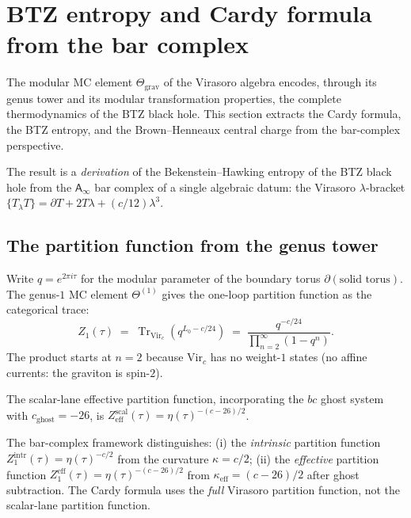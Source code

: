 \documentclass[11pt]{article}
\newcommand{\Ainf}{\mathsf{A}_{\infty}}
\newcommand{\Tr}{\operatorname{Tr}}
\begin{document}
\section{BTZ entropy and Cardy formula from the bar complex}
\label{sec:btz-entropy-cardy}

The modular MC element $\Theta_{\mathrm{grav}}$ of the Virasoro
algebra encodes, through its genus tower and its modular
transformation properties, the complete thermodynamics of the
BTZ black hole.  This section extracts the Cardy formula, the
BTZ entropy, and the Brown--Henneaux central charge from the
bar-complex perspective.

The result is a \emph{derivation} of the Bekenstein--Hawking
entropy of the BTZ black hole from the $\Ainf$ bar complex of
a single algebraic datum: the Virasoro $\lambda$-bracket
$\{T_\lambda T\} = \partial T + 2T\lambda + (c/12)\lambda^3$.

\subsection{The partition function from the genus tower}
\label{subsec:btz-partition}

Write $q = e^{2\pi i\tau}$ for the modular parameter of the
boundary torus $\partial(\text{solid torus})$.  The genus-$1$
MC element $\Theta^{(1)}$ gives the one-loop partition function
as the categorical trace:
\begin{equation}\label{eq:btz-Z1}
Z_1(\tau)
\;=\;
\Tr_{\mathrm{Vir}_c}\!\left(q^{L_0 - c/24}\right)
\;=\;
\frac{q^{-c/24}}{\prod_{n=2}^{\infty}(1-q^n)}.
\end{equation}
The product starts at $n=2$ because $\mathrm{Vir}_c$ has no
weight-$1$ states (no affine currents: the graviton is spin-$2$).

The scalar-lane effective partition function, incorporating the
$bc$ ghost system with $c_{\mathrm{ghost}} = -26$, is
$Z_{\mathrm{eff}}^{\mathrm{scal}}(\tau) = \eta(\tau)^{-(c-26)/2}$.

\begin{observation}
\label{obs:two-partition-functions-wn}
The bar-complex framework distinguishes:
(i) the \emph{intrinsic} partition function
$Z_1^{\mathrm{intr}}(\tau) = \eta(\tau)^{-c/2}$ from the
curvature $\kappa = c/2$;
(ii) the \emph{effective} partition function
$Z_1^{\mathrm{eff}}(\tau) = \eta(\tau)^{-(c-26)/2}$ from
$\kappa_{\mathrm{eff}} = (c-26)/2$ after ghost subtraction.
The Cardy formula uses the \emph{full} Virasoro partition
function, not the scalar-lane partition function.
\end{observation}
\end{document}
